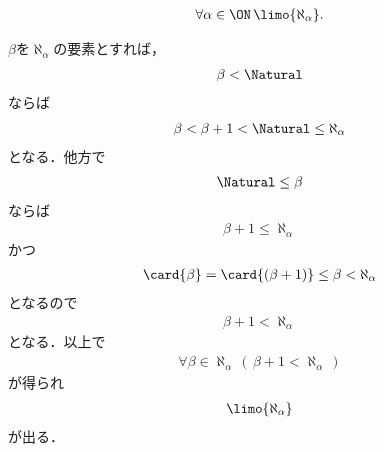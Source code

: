 	\begin{screen}
		\begin{thm}[無限基数は極限数]
			\begin{align}
				\forall \alpha \in \ON\, \limo{\aleph_{\alpha}}.
			\end{align}
		\end{thm}
	\end{screen}
	
	\begin{sketch}
		$\beta$を$\aleph_{\alpha}$の要素とすれば，
		\begin{align}
			\beta < \Natural
		\end{align}
		ならば
		\begin{align}
			\beta < \beta + 1 < \Natural \leq \aleph_{\alpha}
		\end{align}
		となる．他方で
		\begin{align}
			\Natural \leq \beta
		\end{align}
		ならば
		\begin{align}
			\beta + 1 \leq \aleph_{\alpha}
		\end{align}
		かつ
		\begin{align}
			\card{\beta} = \card{(\beta + 1)} \leq \beta < \aleph_{\alpha}
		\end{align}
		となるので
		\begin{align}
			\beta + 1 < \aleph_{\alpha}
		\end{align}
		となる．以上で
		\begin{align}
			\forall \beta \in \aleph_{\alpha}\, (\, \beta + 1 < \aleph_{\alpha}\, )
		\end{align}
		が得られ
		\begin{align}
			\limo{\aleph_{\alpha}}
		\end{align}
		が出る．
		\QED
	\end{sketch}